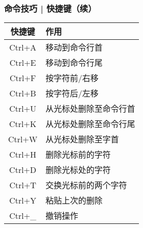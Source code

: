 \begin{frame}
  \frametitle{命令技巧 | 快捷键（续）}
  \begin{table}
    \centering
    \begin{tabularx}{0.6\textwidth}{cX}
      \hline
      \rowcolor{blue!50}快捷键 & 作用\\
      \hline
      Ctrl+A & 移动到命令行首\\
      Ctrl+E & 移动到命令行尾\\
      Ctrl+F & 按字符前/右移\\
      Ctrl+B & 按字符后/左移\\
      \hline
      Ctrl+U & 从光标处删除至命令行首\\
      Ctrl+K & 从光标处删除至命令行尾\\
      Ctrl+W & 从光标处删除至字首\\
      Ctrl+H & 删除光标前的字符\\
      Ctrl+D & 删除光标处的字符\\
      Ctrl+T & 交换光标前的两个字符\\
      Ctrl+Y & 粘贴上次的删除\\
      Ctrl+\_ & 撤销操作\\
      \hline
    \end{tabularx}
  \end{table}
\end{frame}

